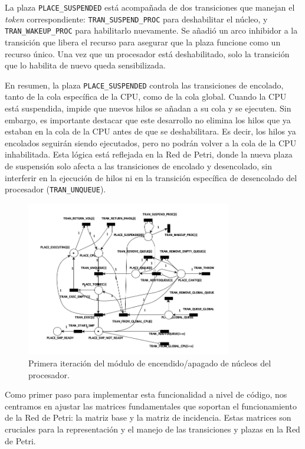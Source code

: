 La plaza \verb|PLACE_SUSPENDED| está acompañada de dos transiciones que manejan el \textit{token} correspondiente: \verb|TRAN_SUSPEND_PROC| para deshabilitar el núcleo, y \verb|TRAN_WAKEUP_PROC| para habilitarlo nuevamente. Se añadió un arco inhibidor a la transición que libera el recurso para asegurar que la plaza funcione como un recurso único. Una vez que un procesador está deshabilitado, solo la transición que lo habilita de nuevo queda sensibilizada.\par

En resumen, la plaza \verb|PLACE_SUSPENDED| controla las transiciones de encolado, tanto de la cola específica de la CPU, como de la cola global. Cuando la CPU está suspendida, impide que nuevos hilos se añadan a su cola y se ejecuten. Sin embargo, es importante destacar que este desarrollo no elimina los hilos que ya estaban en la cola de la CPU antes de que se deshabilitara. Es decir, los hilos ya encolados seguirán siendo ejecutados, pero no podrán volver a la cola de la CPU inhabilitada. Esta lógica está reflejada en la Red de Petri, donde la nueva plaza de suspensión solo afecta a las transiciones de encolado y desencolado, sin interferir en la ejecución de hilos ni en la transición específica de desencolado del procesador (\verb|TRAN_UNQUEUE|).\par

\begin{figure}[H]
    \centering
    \vspace*{0.1in}
    \includegraphics[width=0.8\textwidth]{./images/cpuOnOff-1st-iteration.png}
    \caption{Primera iteración del módulo de encendido/apagado de núcleos del procesador.}
    \label{fig:cpu-on-off-1st-iteration}
\end{figure}

Como primer paso para implementar esta funcionalidad a nivel de código, nos centramos en ajustar las matrices fundamentales que soportan el funcionamiento de la Red de Petri: la matriz base y la matriz de incidencia. Estas matrices son cruciales para la representación y el manejo de las transiciones y plazas en la Red de Petri.\par

